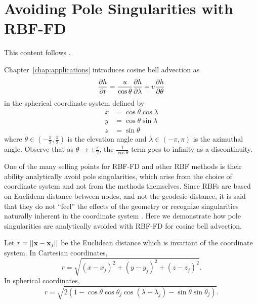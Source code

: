%
% 
%
%

\chapter{Avoiding Pole Singularities with RBF-FD}
\label{app:rbffd_remove_singularities}

This content follows \cite{FlyerWright07,FlyerWright09}. 

Chapter~\ref{chap:applications} introduces cosine bell advection as
\begin{equation}
\frac{\partial h}{\partial t} = \frac{u}{\cos{\theta}} \frac{\partial h}{\partial \lambda} + v \frac{\partial h}{\partial \theta} \label{eq:cosine_bell_appendix}
\end{equation}
in the spherical coordinate system defined by
\begin{align*}
x & = \cos{\theta}\cos{\lambda} \\
y & = \cos{\theta}\sin{\lambda} \\
z & = \sin{\theta}
\end{align*}
where $\theta \in (-\frac{\pi}{2}, \frac{\pi}{2})$ is the elevation angle and $\lambda \in (-\pi,\pi)$ is the azimuthal angle.
Observe that as $\theta \rightarrow \pm \frac{\pi}{2}$, the $\frac{1}{\cos{\theta}}$ term goes to infinity as a discontinuity. 

One of the many selling points for RBF-FD and other RBF methods is their ability analytically avoid pole singularities, which arise from the choice of coordinate system and not from the methods themselves. Since RBFs are based on Euclidean distance between nodes, and not the geodesic distance, it is said that they do not ``feel'' the effects of the geometry or recognize singularities naturally inherent in the coordinate system \cite{FlyerWright07}. 
Here we demonstrate how pole singularities are analytically avoided with RBF-FD for cosine bell advection.  


Let $r = || \mathbf{x} - \mathbf{x}_j ||$ be the Euclidean distance which is invariant of the coordinate system. In Cartesian coordinates, 
$$
r = \sqrt{(x-x_j)^2 + (y-y_j)^2 + (z-z_j)^2}.
$$
In spherical coordinates,
$$
r = \sqrt{2(1-\cos{\theta}\cos{\theta_j}\cos{(\lambda-\lambda_j)} - \sin{\theta}\sin{\theta_j})}.
$$

